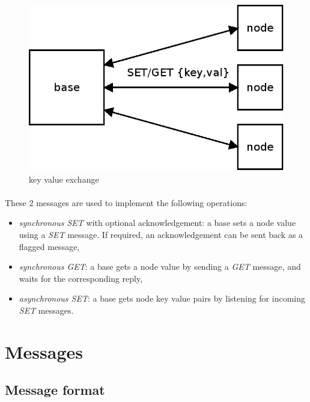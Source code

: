 \documentclass[a4paper, 11pt]{article}
\begin{document}
\begin{figure}[!h]
\begin{center}
\includegraphics[scale=0.2]{../dia/overview_keyval/main.jpeg}
\end{center}
\caption{\tiny{key value exchange}}
\label{overview_keyval}
\end{figure}

\paragraph{}
These 2 messages are used to implement the following operations:
\begin{itemize}
\item \textit{synchronous SET} with optional acknowledgement: a base sets a
node value using a \textit{SET} message. If required, an acknowledgement can
be sent back as a flagged message,
\item \textit{synchronous GET}: a base gets a node value by sending a
\textit{GET} message, and waits for the corresponding reply,
\item \textit{asynchronous SET}: a base gets node key value pairs by listening
for incoming \textit{SET} messages.
\end{itemize}


\clearpage
\section{Messages}

\subsection{Message format}
\end{document}

